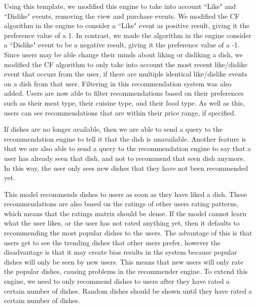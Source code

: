 Using this template, we modified this engine to take into account ``Like" and ``Dislike" events, removing the view and purchase events. We modified the CF algorithm in the engine to consider a ``Like" event as positive result, giving it the preference value of a 1. In contrast, we made the algorithm in the engine consider a ``Dislike" event to be a negative result, giving it the preference value of a -1. Since users may be able change their minds about liking or disliking a dish, we modified the CF algorithm to only take into account the most recent like/dislike event that occurs from the user, if there are multiple identical like/dislike events on a dish from that user. Filtering in this recommendation system was also added. Users are now able to filter recommendations based on their preferences such as their meat type, their cuisine type, and their food type. As well as this, users can see recommendations that are within their price range, if specified. 

If dishes are no longer available, then we are able to send a query to the recommendation engine to tell it that the dish is unavailable. Another feature is that we are also able to send a query to the recommendation engine to say that a user has already seen that dish, and not to recommend that seen dish anymore. In this way, the user only sees new dishes that they have not been recommended yet.

This model recommends dishes to users as soon as they have liked a dish. These recommendations are also based on the ratings of other users rating patterns, which means that the ratings matrix should be dense. If the model cannot learn what the user likes, or the user has not rated anything yet, then it defaults to recommending the most popular dishes to the users. The advantage of this is that users get to see the trending dishes that other users prefer, however the disadvantage is that it may create bias results in the system because popular dishes will only be seen by new users. This means that new users will only rate the popular dishes, causing problems in the recommender engine. To extend this engine, we need to only recommend dishes to users after they have rated a certain number of dishes. Random dishes should be shown until they have rated a certain number of dishes. 



